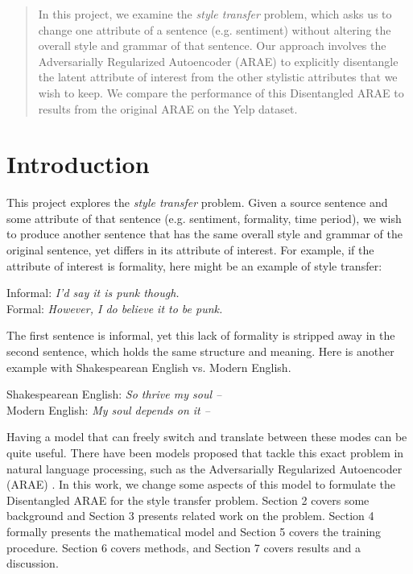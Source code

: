 \documentclass{article}
\begin{document}

\begin{abstract}
In this project, we examine the \emph{style transfer} problem, which asks us to change one attribute of a sentence (e.g. sentiment) without altering the overall style and grammar of that sentence.  Our approach involves the Adversarially Regularized Autoencoder (ARAE) \cite{arae} to explicitly disentangle the latent attribute of interest from the other stylistic attributes that we wish to keep.  We compare the performance of this Disentangled ARAE to results from the original ARAE on the Yelp dataset.
\end{abstract}

\section{Introduction}
\label{sec:introduction}

This project explores the \emph{style transfer} problem.  Given a source sentence and some attribute of that sentence (e.g. sentiment, formality, time period), we wish to produce another sentence that has the same overall style and grammar of the original sentence, yet differs in its attribute of interest.  For example, if the attribute of interest is formality, here might be an example of style transfer:

\begin{center}
Informal: \emph{I'd say it is punk though.} \\
Formal: \emph{However, I do believe it to be punk.}
\end{center}

The first sentence is informal, yet this lack of formality is stripped away in the second sentence, which holds the same structure and meaning.  Here is another example with Shakespearean English vs. Modern English.

\begin{center}
Shakespearean English: \emph{So thrive my soul --} \\
Modern English: \emph{My soul depends on it --}
\end{center} 

Having a model that can freely switch and translate between these modes can be quite useful.  There have been models proposed that tackle this exact problem in natural language processing, such as the Adversarially Regularized Autoencoder (ARAE) \cite{arae}.  In this work, we change some aspects of this model to formulate the Disentangled ARAE for the style transfer problem.  Section 2 covers some background and Section 3 presents related work on the problem.  Section 4 formally presents the mathematical model and Section 5 covers the training procedure.  Section 6 covers methods, and Section 7 covers results and a discussion.  
\end{document}
